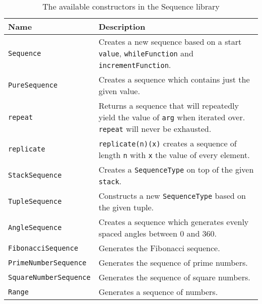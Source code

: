 \begin{table}[H]
  \centering
  \begin{tabularx}{\textwidth}{| l | X |} \hline
    \textbf{Name} & \textbf{Description} \\ \hline
    \texttt{Sequence} & Creates a new sequence based on a start \texttt{value}, \texttt{whileFunction} and \texttt{incrementFunction}. \\ \hline
    \texttt{PureSequence} & Creates a sequence which contains just the given value. \\ \hline
    \texttt{repeat} & Returns a sequence that will repeatedly yield the value of \texttt{arg} when iterated over. \texttt{repeat} will never be exhausted. \\ \hline
    \texttt{replicate} & \texttt{replicate(n)(x)} creates a sequence of length \texttt{n} with \texttt{x} the value of every element. \\ \hline
    \texttt{StackSequence} & Creates a \texttt{SequenceType} on top of the given \texttt{stack}. \\ \hline
    \texttt{TupleSequence} & Constructs a new \texttt{SequenceType} based on the given tuple. \\ \hline
    \texttt{AngleSequence} & Creates a sequence which generates evenly spaced angles between 0 and 360. \\ \hline
    \texttt{FibonacciSequence} & Generates the Fibonacci sequence. \\  \hline
    \texttt{PrimeNumberSequence} & Generates the sequence of prime numbers. \\ \hline
    \texttt{SquareNumberSequence} & Generates the sequence of square numbers. \\ \hline
    \texttt{Range} & Generates a sequence of numbers. \cite{wild_ip5_2023} \\ \hline
  \end{tabularx}
  \caption{The available constructors in the Sequence library}
  \label{tab:api_ctors}
\end{table}


